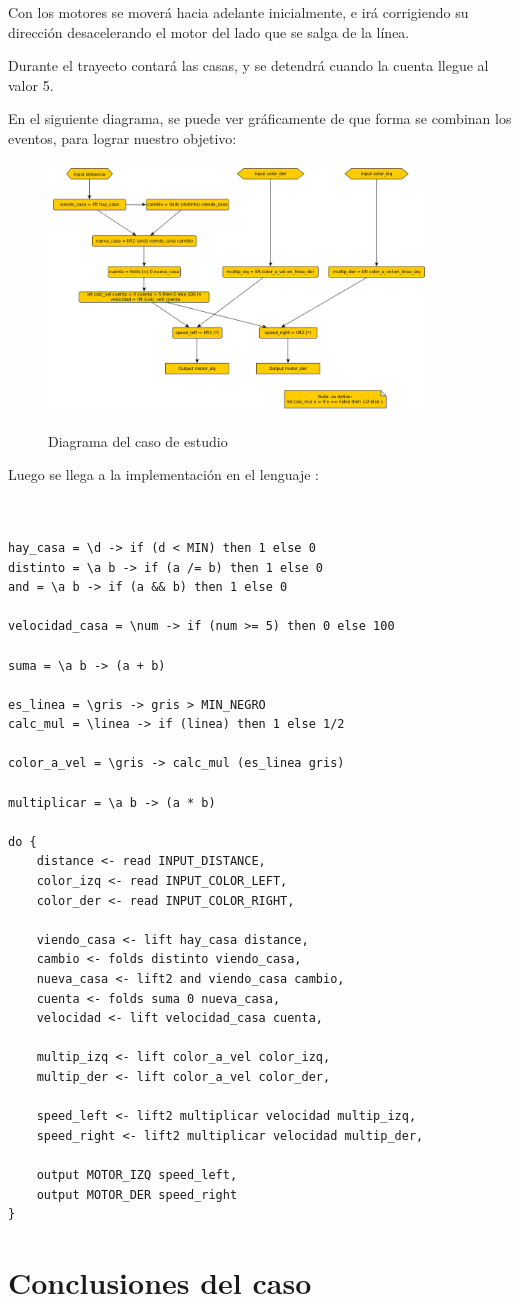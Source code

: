   Con los motores se moverá hacia adelante inicialmente, e irá corrigiendo
  su dirección desacelerando el motor del lado que se salga de la línea.

  Durante el trayecto contará las casas, y se detendrá cuando la cuenta
llegue al valor 5.

  En el siguiente diagrama, se puede ver gráficamente de que forma
se combinan los eventos, para lograr nuestro objetivo:

\begin{figure}[hbtp]
\begin{center}
\caption{Diagrama del caso de estudio}
\includegraphics[width=0.9\textwidth]{graphs/delivery.png}
\label{fig:delivery}
\end{center}
\end{figure}

  Luego se llega a la implementación en el lenguaje \frob :

\begin{verbatim}


hay_casa = \d -> if (d < MIN) then 1 else 0
distinto = \a b -> if (a /= b) then 1 else 0
and = \a b -> if (a && b) then 1 else 0

velocidad_casa = \num -> if (num >= 5) then 0 else 100

suma = \a b -> (a + b)

es_linea = \gris -> gris > MIN_NEGRO
calc_mul = \linea -> if (linea) then 1 else 1/2

color_a_vel = \gris -> calc_mul (es_linea gris)

multiplicar = \a b -> (a * b)

do {
    distance <- read INPUT_DISTANCE,
    color_izq <- read INPUT_COLOR_LEFT,
    color_der <- read INPUT_COLOR_RIGHT,

    viendo_casa <- lift hay_casa distance,
    cambio <- folds distinto viendo_casa,
    nueva_casa <- lift2 and viendo_casa cambio,
    cuenta <- folds suma 0 nueva_casa,
    velocidad <- lift velocidad_casa cuenta,

    multip_izq <- lift color_a_vel color_izq,
    multip_der <- lift color_a_vel color_der,

    speed_left <- lift2 multiplicar velocidad multip_izq,
    speed_right <- lift2 multiplicar velocidad multip_der,

    output MOTOR_IZQ speed_left,
    output MOTOR_DER speed_right
}

\end{verbatim}

\section {Conclusiones del caso}


